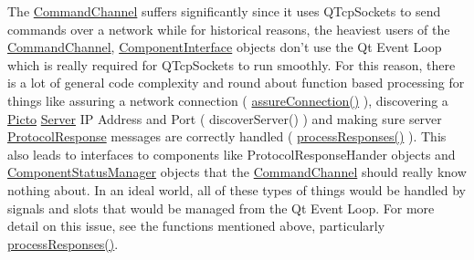 The \hyperlink{class_picto_1_1_command_channel}{Command\-Channel} suffers significantly since it uses Q\-Tcp\-Sockets to send commands over a network while for historical reasons, the heaviest users of the \hyperlink{class_picto_1_1_command_channel}{Command\-Channel}, \hyperlink{class_component_interface}{Component\-Interface} objects don't use the Qt Event Loop which is really required for Q\-Tcp\-Sockets to run smoothly. For this reason, there is a lot of general code complexity and round about function based processing for things like assuring a network connection ( \hyperlink{class_picto_1_1_command_channel_a785fa9b2dccc12b6419dc9d8be3d2e21}{assure\-Connection()} ), discovering a \hyperlink{namespace_picto}{Picto} \hyperlink{class_server}{Server} I\-P Address and Port ( discover\-Server() ) and making sure server \hyperlink{struct_picto_1_1_protocol_response}{Protocol\-Response} messages are correctly handled ( \hyperlink{class_picto_1_1_command_channel_aafe619791fb542563544ecf50628238b}{process\-Responses()} ). This also leads to interfaces to components like Protocol\-Response\-Hander objects and \hyperlink{class_component_status_manager}{Component\-Status\-Manager} objects that the \hyperlink{class_picto_1_1_command_channel}{Command\-Channel} should really know nothing about. In an ideal world, all of these types of things would be handled by signals and slots that would be managed from the Qt Event Loop. For more detail on this issue, see the functions mentioned above, particularly \hyperlink{class_picto_1_1_command_channel_aafe619791fb542563544ecf50628238b}{process\-Responses()}.

